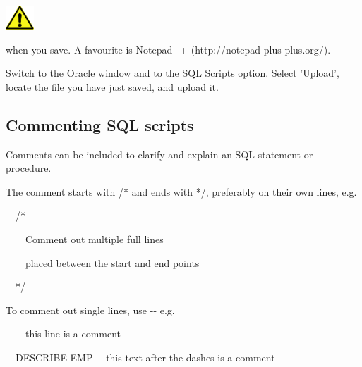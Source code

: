 \begin{center}
  
\includegraphics[width=1.06cm,height=0.903cm]{images/img (2).png}

\end{center}
 when you save. A favourite is Notepad++ (http://notepad-plus-plus.org/).

Switch to the Oracle window and to the SQL Scripts option. Select 'Upload', locate the file you have just saved, and upload it.

\subsection{}
\subsection{}
\subsection{Commenting SQL scripts}
Comments can be included to clarify and explain an SQL statement or procedure. 

The comment starts with /* and ends with */, preferably on their own lines, e.g.

\ \ /*

 \ \ \ \ Comment out multiple full lines

\ \ \ \ placed between the start and end points 

\ \ */

To comment out single lines, use -{}- e.g.

\ \ {}-{}-  this line is a comment

\ \ DESCRIBE EMP -{}- this text after the dashes is a comment

\clearpage